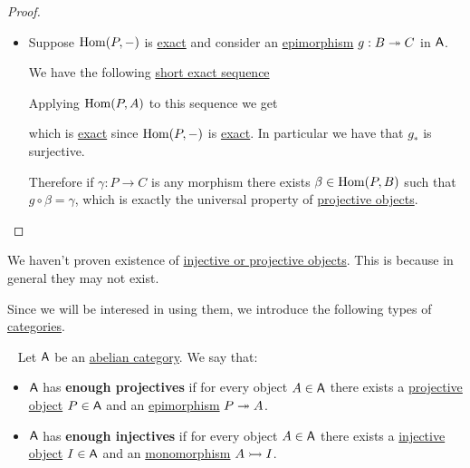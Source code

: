 \documentclass[../../../main]{subfiles}
\begin{document}
\begin{proof}
\begin{itemize}
    \item[\(\impliedby\)] Suppose \(\operatorname{Hom}(P, -)\) is \hyperref[def:exact-functor]{exact} and consider an \hyperref[def:mono-epi-morphism]{epimorphism} \(g: B \twoheadrightarrow C\) in \(\mathsf{A}\).

          We have the following \hyperref[def:short-exact-sequence]{short exact sequence}
          \begin{center}
          \end{center}
          Applying \(\operatorname{Hom}(P, A)\) to this sequence we get
           \begin{center}
          \end{center}
          which is \hyperref[def:short-exact-sequence]{exact} since \(\operatorname{Hom}(P, -)\) is \hyperref[def:exact-functor]{exact}.
          In particular we have that \(g_{\ast}\) is surjective.

          Therefore if \(\gamma: P \to C\) is any morphism there exists \(\beta \in \operatorname{Hom}(P, B)\) such that \(g \circ \beta = \gamma\), which is exactly the universal property of \hyperref[def:injective-projective-objects]{projective objects}.
  \end{itemize}
\end{proof}


We haven't proven existence of \hyperref[def:injective-projective-objects]{injective or projective objects}.
This is because in general they may not exist.

Since we will be interesed in using them, we introduce the following types of \hyperref[def:big-category]{categories}.
\begin{definition} \label{def:enough-projective-injectives}~
  Let \(\mathsf{A}\) be an \hyperref[def:abelian-category]{abelian category}. We say that:
  \begin{itemize}
    \item \(\mathsf{A}\) has \textbf{enough projectives} if for every object \(A \in \mathsf{A}\) there exists a \hyperref[def:injective-projective-objects]{projective object} \(P \in \mathsf{A}\) and an \hyperref[def:mono-epi-morphism]{epimorphism} \(P \twoheadrightarrow A\).
    \item \(\mathsf{A}\) has \textbf{enough injectives} if for every object \(A \in \mathsf{A}\) there exists a \hyperref[def:injective-projective-objects]{injective object} \(I \in \mathsf{A}\) and an \hyperref[def:mono-epi-morphism]{monomorphism} \(A \rightarrowtail I\).
  \end{itemize}
\end{definition}
\end{document}
